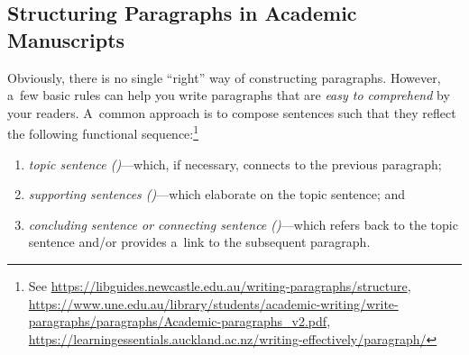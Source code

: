 \subsection{Structuring Paragraphs in Academic Manuscripts}

\begingroup

\setul{0.3ex}{0.5ex}

\let \longtblrOrig \longtblr
\renewcommand{\longtblr}{%
	\fontsize{\fsnormal}{\smalllinespacing}\selectfont%
	\longtblrOrig%
}

Obviously, there is no single ``right'' way of constructing paragraphs. However, a~few basic rules can help you write paragraphs that are \emph{easy to comprehend} by your readers. A~common approach is to compose sentences such that they reflect the following functional sequence:\footnote{See \url{https://libguides.newcastle.edu.au/writing-paragraphs/structure}, \url{https://www.une.edu.au/library/students/academic-writing/write-paragraphs/paragraphs/Academic-paragraphs_v2.pdf}, \url{https://learningessentials.auckland.ac.nz/writing-effectively/paragraph/}}
\begin{enumerate}
	\item \emph{topic sentence ()}---which, if necessary, connects to the previous paragraph;
	\item \emph{supporting sentences ()}---which elaborate on the topic sentence; and
	\item \emph{concluding sentence or connecting sentence ()}---which refers back to the topic sentence and\slash or provides a~link to the subsequent paragraph.
\end{enumerate}

